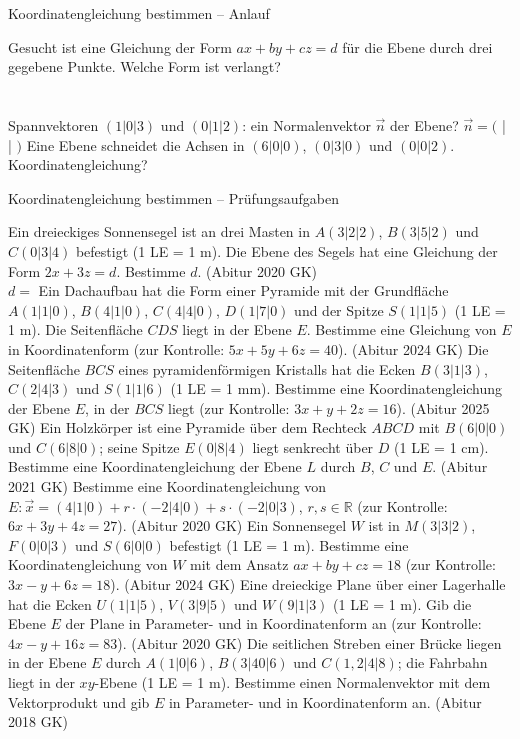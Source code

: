 \begin{aufgabe}{Koordinatengleichung bestimmen – Anlauf}
\begin{teile}
\teil Gesucht ist eine Gleichung der Form $ax + by + cz = d$ für die Ebene durch drei gegebene Punkte. Welche Form ist verlangt? \\  \\  \\ 
\teil Spannvektoren $(1 | 0 | 3)$ und $(0 | 1 | 2)$: ein Normalenvektor $\vec n$ der Ebene? $\vec n = ($ \leerfeld | \leerfeld | \leerfeld $)$
\teil Eine Ebene schneidet die Achsen in $(6 | 0 | 0)$, $(0 | 3 | 0)$ und $(0 | 0 | 2)$. Koordinatengleichung?
\end{teile}
\end{aufgabe}

\begin{aufgabe}{Koordinatengleichung bestimmen – Prüfungsaufgaben}
\begin{teile}
\teil Ein dreieckiges Sonnensegel ist an drei Masten in $A(3 | 2 | 2)$, $B(3 | 5 | 2)$ und $C(0 | 3 | 4)$ befestigt (1 LE = 1 m). Die Ebene des Segels hat eine Gleichung der Form $2x + 3z = d$. Bestimme $d$. \hfill (Abitur 2020 GK) \\ $d = $ \leerfeld
\teil Ein Dachaufbau hat die Form einer Pyramide mit der Grundfläche $A(1 | 1 | 0)$, $B(4 | 1 | 0)$, $C(4 | 4 | 0)$, $D(1 | 7 | 0)$ und der Spitze $S(1 | 1 | 5)$ (1 LE = 1 m). Die Seitenfläche $CDS$ liegt in der Ebene $E$. Bestimme eine Gleichung von $E$ in Koordinatenform (zur Kontrolle: $5x + 5y + 6z = 40$). \hfill (Abitur 2024 GK)
\teil Die Seitenfläche $BCS$ eines pyramidenförmigen Kristalls hat die Ecken $B(3 | 1 | 3)$, $C(2 | 4 | 3)$ und $S(1 | 1 | 6)$ (1 LE = 1 mm). Bestimme eine Koordinatengleichung der Ebene $E$, in der $BCS$ liegt (zur Kontrolle: $3x + y + 2z = 16$). \hfill (Abitur 2025 GK)
\teil Ein Holzkörper ist eine Pyramide über dem Rechteck $ABCD$ mit $B(6 | 0 | 0)$ und $C(6 | 8 | 0)$; seine Spitze $E(0 | 8 | 4)$ liegt senkrecht über $D$ (1 LE = 1 cm). Bestimme eine Koordinatengleichung der Ebene $L$ durch $B$, $C$ und $E$. \hfill (Abitur 2021 GK)
\teil Bestimme eine Koordinatengleichung von $E\colon \vec x = (4 | 1 | 0) + r \cdot (-2 | 4 | 0) + s \cdot (-2 | 0 | 3)$, $r, s \in \mathbb{R}$ (zur Kontrolle: $6x + 3y + 4z = 27$). \hfill (Abitur 2020 GK)
\teil Ein Sonnensegel $W$ ist in $M(3 | 3 | 2)$, $F(0 | 0 | 3)$ und $S(6 | 0 | 0)$ befestigt (1 LE = 1 m). Bestimme eine Koordinatengleichung von $W$ mit dem Ansatz $ax + by + cz = 18$ (zur Kontrolle: $3x - y + 6z = 18$). \hfill (Abitur 2024 GK)
\teil Eine dreieckige Plane über einer Lagerhalle hat die Ecken $U(1 | 1 | 5)$, $V(3 | 9 | 5)$ und $W(9 | 1 | 3)$ (1 LE = 1 m). Gib die Ebene $E$ der Plane in Parameter- und in Koordinatenform an (zur Kontrolle: $4x - y + 16z = 83$). \hfill (Abitur 2020 GK)
\teil Die seitlichen Streben einer Brücke liegen in der Ebene $E$ durch $A(1 | 0 | 6)$, $B(3 | 40 | 6)$ und $C(1{,}2 | 4 | 8)$; die Fahrbahn liegt in der $xy$-Ebene (1 LE = 1 m). Bestimme einen Normalenvektor mit dem Vektorprodukt und gib $E$ in Parameter- und in Koordinatenform an. \hfill (Abitur 2018 GK)
\end{teile}
\end{aufgabe}

